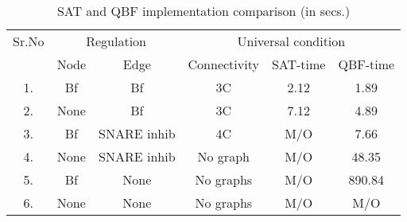 \begin{table}[t]
	\centering
	    \def\arraystretch{1.1}
		\begin{tabular}[t]{|c|c|c|c|c|c|}\hline
			
			{\multirow{2}{*} {Sr.No}}  & \multicolumn{2}{c|}{Regulation} & \multicolumn{3}{c|}{Universal condition} 
			
			

			
			\\\cline{2-6}
			{} & {Node} & {Edge} & {Connectivity} & {SAT-time} & {QBF-time}
			
			\\\hline
			1. & Bf & Bf & 3C & 2.12 & 1.89  \\\hline
			2. & None & Bf  & 3C & 7.12 & 4.89  \\\hline
			3. & Bf & SNARE inhib & 4C  & M/O & 7.66 \\\hline
			4. & None & SNARE inhib  & No graph & M/O & 48.35 \\\hline
			5. & Bf & None  & No graphs & M/O & 890.84 \\\hline
			6. &  None & None  & No graphs & M/O & M/O \\\hline
			
	\end{tabular}
	\caption{ SAT and QBF implementation comparison (in secs.)}
	\label{tab:satqbf-graph}
\end{table}